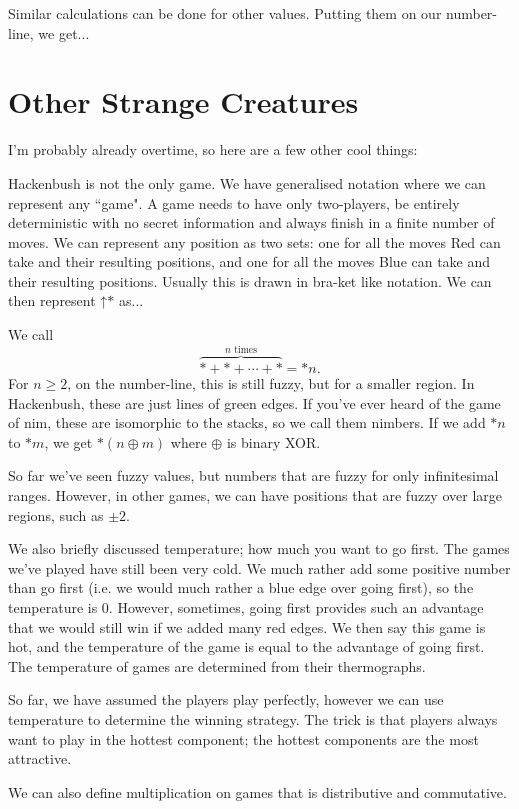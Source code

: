 \documentclass[]{article}
\renewcommand{\star}{\mathord{*}}
\newcommand{\up}{\mathord{\uparrow}}
\begin{document}
Similar calculations can be done for other values. Putting them on our number-line, we get...

\section{Other Strange Creatures}
I'm probably already overtime, so here are a few other cool things:

Hackenbush is not the only game. We have generalised notation where we can represent any ``game". A game needs to have only two-players, be entirely deterministic with no secret information and always finish in a finite number of moves. We can represent any position as two sets: one for all the moves Red can take and their resulting positions, and one for all the moves Blue can take and their resulting positions. Usually this is drawn in bra-ket like notation. We can then represent $\up\star$ as...

We call $$\overbrace{\star+\star+\cdots+\star}^{n\text{ times}} = \star n.$$ For $n\geq2$, on the number-line, this is still fuzzy, but for a smaller region. In Hackenbush, these are just lines of green edges. If you've ever heard of the game of nim, these are isomorphic to the stacks, so we call them nimbers. If we add $\star n$ to $\star m$, we get $\star(n\oplus m)$ where $\oplus$ is binary XOR.

So far we've seen fuzzy values, but numbers that are fuzzy for only infinitesimal ranges. However, in other games, we can have positions that are fuzzy over large regions, such as $\pm2$.

We also briefly discussed temperature; how much you want to go first. The games we've played have still been very cold. We much rather add some positive number than go first (i.e. we would much rather a blue edge over going first), so the temperature is 0. However, sometimes, going first provides such an advantage that we would still win if we added many red edges. We then say this game is hot, and the temperature of the game is equal to the advantage of going first. The temperature of games are determined from their thermographs.

So far, we have assumed the players play perfectly, however we can use temperature to determine the winning strategy. The trick is that players always want to play in the hottest component; the hottest components are the most attractive.

We can also define multiplication on games that is distributive and commutative.
\end{document}
